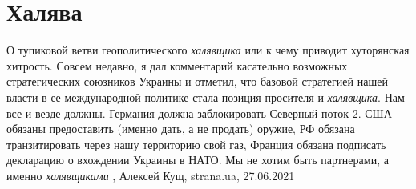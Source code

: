  
 
 
 
 
\chapter{Халява}
\label{sec:slova.haljava}

О тупиковой ветви геополитического \emph{халявщика} или к чему приводит хуторянская
хитрость.  Совсем недавно, я дал комментарий касательно возможных
стратегических союзников Украины и отметил, что базовой стратегией нашей власти
в ее международной политике стала позиция просителя и \emph{халявщика}.  Нам все и
везде должны.  Германия должна заблокировать Северный поток-2. США обязаны
предоставить (именно дать, а не продать) оружие, РФ обязана транзитировать
через нашу территорию свой газ, Франция обязана подписать декларацию о
вхождении Украины в НАТО.  Мы не хотим быть партнерами, а именно \emph{халявщиками}
, 
Алексей Кущ, strana.ua, 27.06.2021

